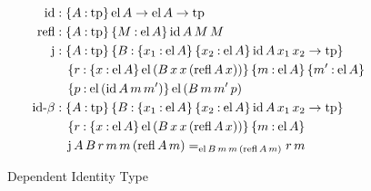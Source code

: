 \documentclass[11pt,twoside]{article}
\newcommand{\braces}[1]{\{#1\}}
\newcommand{\parens}[1]{(#1)}
\newcommand{\eqclass}[3]{{#2}=_{#1}{#3}}
\newcommand{\piclass}[3]{\braces{{#2}\mathbin{:}{#1}}\,{#3}}
\newcommand{\arrclass}[2]{{#1}\to{#2}}
\newcommand{\appobj}[2]{{#1}\,{#2}}
\begin{document}
\begin{figure}
  
  \begin{align*}
    \idcon & : \piclass{\tpsort}{A}{\arrclass{\elof{A}}{\arrclass{\elof{A}}{\tpsort}}} \\
    \reflcon & : \piclass{\tpsort}{A}{\piclass{\elof{A}}{M}{\idof{A}{M}{M}}} \\
    \jcon & :
            \piclass{\tpsort}{A}{
            \piclass{\piclass{\elof{A}}{x_{1}}{\piclass{\elof{A}}{x_{2}}{\arrclass{\idof{A}{x_{1}}{x_{2}}}{\tpsort}}}}{B}{
            }} \\
           & \quad
             \piclass{\piclass{\elof{A}}{x}{\elofp{\appobj{\appobj{\appobj{B}{x}}{x}}{\parens{\reflof{A}{x}}}}}}{r}{
             \piclass{\elof{A}}{m}{\piclass{\elof{A}}{m'}{
             }}} \\
             & \quad
               \piclass{\elofp{\idof{A}{m}{m'}}}{p}{\elofp{\appobj{\appobj{\appobj{B}{m}}{m'}}{p}}} \\
    \idbetacon & :
            \piclass{\tpsort}{A}{
            \piclass{\piclass{\elof{A}}{x_{1}}{\piclass{\elof{A}}{x_{2}}{\arrclass{\idof{A}{x_{1}}{x_{2}}}{\tpsort}}}}{B}{
            }} \\
           & \quad
             \piclass{\piclass{\elof{A}}{x}{\elofp{\appobj{\appobj{\appobj{B}{x}}{x}}{\parens{\reflof{A}{x}}}}}}{r}{
             \piclass{\elof{A}}{m}{
             }} \\
           & \quad
             \eqclass
             {\elof{\appobj{\appobj{\appobj{B}{m}}{m}}{\parens{\reflof{A}{m}}}}}
             {\jof{A}{B}{r}{m}{m}{\parens{\reflof{A}{m}}}}
             {\appobj{r}{m}}
  \end{align*}

  \caption{Dependent Identity Type}
  \label{fig:dep-id}
\end{figure}



\end{document}

